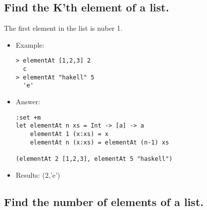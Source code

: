 \documentclass[11pt]{article}
\begin{document}
\subsection{Find the K'th element of a list.}
\label{sec-1-3}

The first element in the list is nuber 1.

\begin{itemize}
\item Example:

\begin{verbatim}
> elementAt [1,2,3] 2
  c 
> elementAt "hakell" 5
  'e'
\end{verbatim}
\item Answer:

\begin{verbatim}
:set +m
let elementAt n xs = Int -> [a] -> a
    elementAt 1 (x:xs) = x
    elementAt n (x:xs) = elementAt (n-1) xs

(elementAt 2 [1,2,3], elementAt 5 "haskell")
\end{verbatim}
\end{itemize}

  
\begin{itemize}
\item Results: (2,'e')
\end{itemize}
\subsection{Find the number of elements of a list.}
\label{sec-1-4}
\end{document}
